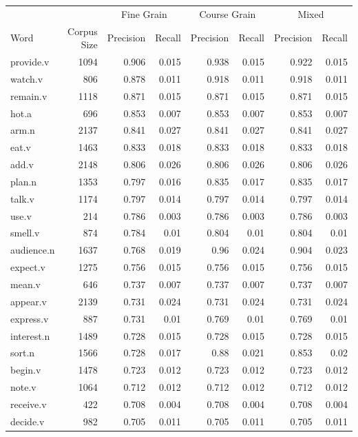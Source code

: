\documentclass{article}
\begin{document}
\begin{longtable}{l | r r r r r r r}
		&	&	\multicolumn{2}{c}{Fine Grain}	&	\multicolumn{2}{c}{Course Grain}	&	\multicolumn{2}{c}{Mixed}\\
Word	&	Corpus Size	&	Precision	&	Recall	&	Precision	&	Recall	&	Precision	&	Recall\\
\hline
provide.v	&	1094	&	0.906	&	0.015	&	0.938	&	0.015	&	0.922	&	0.015\\
watch.v	&	806	&	0.878	&	0.011	&	0.918	&	0.011	&	0.918	&	0.011\\
remain.v	&	1118	&	0.871	&	0.015	&	0.871	&	0.015	&	0.871	&	0.015\\
hot.a	&	696	&	0.853	&	0.007	&	0.853	&	0.007	&	0.853	&	0.007\\
arm.n	&	2137	&	0.841	&	0.027	&	0.841	&	0.027	&	0.841	&	0.027\\
eat.v	&	1463	&	0.833	&	0.018	&	0.833	&	0.018	&	0.833	&	0.018\\
add.v	&	2148	&	0.806	&	0.026	&	0.806	&	0.026	&	0.806	&	0.026\\
plan.n	&	1353	&	0.797	&	0.016	&	0.835	&	0.017	&	0.835	&	0.017\\
talk.v	&	1174	&	0.797	&	0.014	&	0.797	&	0.014	&	0.797	&	0.014\\
use.v	&	214	&	0.786	&	0.003	&	0.786	&	0.003	&	0.786	&	0.003\\
smell.v	&	874	&	0.784	&	0.01	&	0.804	&	0.01	&	0.804	&	0.01\\
audience.n	&	1637	&	0.768	&	0.019	&	0.96	&	0.024	&	0.904	&	0.023\\
expect.v	&	1275	&	0.756	&	0.015	&	0.756	&	0.015	&	0.756	&	0.015\\
mean.v	&	646	&	0.737	&	0.007	&	0.737	&	0.007	&	0.737	&	0.007\\
appear.v	&	2139	&	0.731	&	0.024	&	0.731	&	0.024	&	0.731	&	0.024\\
express.v	&	887	&	0.731	&	0.01	&	0.769	&	0.01	&	0.769	&	0.01\\
interest.n	&	1489	&	0.728	&	0.015	&	0.728	&	0.015	&	0.728	&	0.015\\
sort.n	&	1566	&	0.728	&	0.017	&	0.88	&	0.021	&	0.853	&	0.02\\
begin.v	&	1478	&	0.723	&	0.012	&	0.723	&	0.012	&	0.723	&	0.012\\
note.v	&	1064	&	0.712	&	0.012	&	0.712	&	0.012	&	0.712	&	0.012\\
receive.v	&	422	&	0.708	&	0.004	&	0.708	&	0.004	&	0.708	&	0.004\\
decide.v	&	982	&	0.705	&	0.011	&	0.705	&	0.011	&	0.705	&	0.011\\

\end{longtable}
\end{document}
